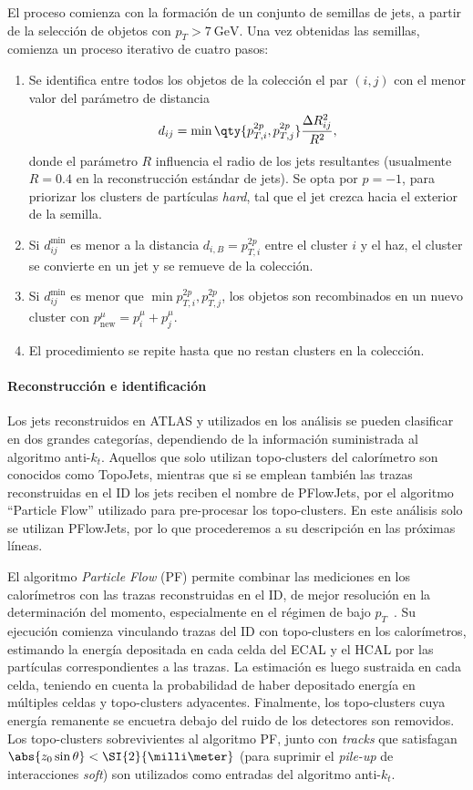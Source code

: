 El proceso comienza con la formación de un conjunto de semillas de jets, a partir de la selección de objetos con $p_T > \SI{7}{\GeV}$. Una vez obtenidas las semillas, comienza un proceso iterativo de cuatro pasos:
\begin{enumerate}
    \item Se identifica entre todos los objetos de la colección el par $(i, j)$ con el menor valor del parámetro de distancia
    \[ d_{ij} = \min\qty{p_{T,i}^{2p}, p_{T,j}^{2p}} \frac{\Delta R_{ij}^2}{R^2}, \]
    donde el parámetro $R$ influencia el radio de los jets resultantes (usualmente $R = 0.4$ en la reconstrucción estándar de jets). Se opta por $p = -1$, para priorizar los clusters de partículas \textit{hard}, tal que el jet crezca hacia el exterior de la semilla.
    \item Si $d_{ij}^{\text{min}}$ es menor a la distancia $d_{i,B} = p_{T,i}^{2p}$ entre el cluster $i$ y el haz, el cluster se convierte en un jet y se remueve de la colección.
    \item Si $d_{ij}^{\text{min}}$ es menor que $\min{p_{T,i}^{2p}, p_{T,j}^{2p}}$, los objetos son recombinados en un nuevo cluster con $p^\mu_{\text{new}} = p^\mu_i + p^\mu_j$.
    \item El procedimiento se repite hasta que no restan clusters en la colección.
\end{enumerate}


\paragraph{Reconstrucción e identificación}

Los jets reconstruidos en ATLAS y utilizados en los análisis se pueden clasificar en dos grandes categorías, dependiendo de la información suministrada al algoritmo anti-$k_t$. Aquellos que solo utilizan topo-clusters del calorímetro son conocidos como TopoJets, mientras que si se emplean también las trazas reconstruidas en el ID los jets reciben el nombre de PFlowJets, por el algoritmo ``Particle Flow'' utilizado para pre-procesar los topo-clusters. En este análisis solo se utilizan PFlowJets, por lo que procederemos a su descripción en las próximas líneas.

El algoritmo \textit{Particle Flow} (PF) permite combinar las mediciones en los calorímetros con las trazas reconstruidas en el ID, de mejor resolución en la determinación del momento, especialmente en el régimen de bajo $p_T$~\cites[-7em][]{TheATLASCollaboration2017a}[-3em][]{TheATLASCollaboration2018}. Su ejecución comienza vinculando trazas del ID con topo-clusters en los calorímetros, estimando la energía depositada en cada celda del ECAL y el HCAL por las partículas correspondientes a las trazas. La estimación es luego sustraida en cada celda, teniendo en cuenta la probabilidad de haber depositado energía en múltiples celdas y topo-clusters adyacentes. Finalmente, los topo-clusters cuya energía remanente se encuetra debajo del ruido de los detectores son removidos. Los topo-clusters sobrevivientes al algoritmo PF, junto con \textit{tracks} que satisfagan $\abs{z_0 \sin\theta} < \SI{2}{\milli\meter}$ (para suprimir el \textit{pile-up} de interacciones \textit{soft}) son utilizados como entradas del algoritmo anti-$k_t$.

